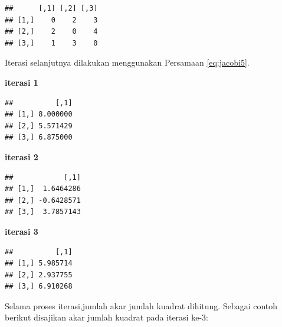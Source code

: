 \documentclass[]{book}
\newenvironment{Shaded}{\begin{snugshade}}{\end{snugshade}}
\newcommand{\NormalTok}[1]{#1}
\newcommand{\OperatorTok}[1]{\textcolor[rgb]{0.81,0.36,0.00}{\textbf{#1}}}
\newcommand{\StringTok}[1]{\textcolor[rgb]{0.31,0.60,0.02}{#1}}
\theoremstyle{definition}
\theoremstyle{definition}
\theoremstyle{definition}
\theoremstyle{remark}
\begin{document}
\begin{verbatim}
##      [,1] [,2] [,3]
## [1,]    0    2    3
## [2,]    2    0    4
## [3,]    1    3    0
\end{verbatim}

Iterasi selanjutnya dilakukan menggunakan Persamaan \eqref{eq:jacobi5}.

\textbf{iterasi 1}

\begin{Shaded}
\end{Shaded}

\begin{verbatim}
##          [,1]
## [1,] 8.000000
## [2,] 5.571429
## [3,] 6.875000
\end{verbatim}

\textbf{iterasi 2}

\begin{Shaded}
\end{Shaded}

\begin{verbatim}
##            [,1]
## [1,]  1.6464286
## [2,] -0.6428571
## [3,]  3.7857143
\end{verbatim}

\textbf{iterasi 3}

\begin{Shaded}
\end{Shaded}

\begin{verbatim}
##          [,1]
## [1,] 5.985714
## [2,] 2.937755
## [3,] 6.910268
\end{verbatim}

Selama proses iterasi,jumlah akar jumlah kuadrat dihitung. Sebagai contoh berikut disajikan akar jumlah kuadrat pada iterasi ke-3:
\end{document}

